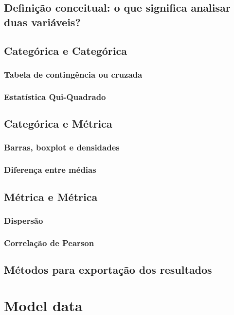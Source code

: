 \documentclass[a4paper,12pt]{article}
\begin{document}
\subsection*{Definição conceitual: o que significa analisar duas variáveis?}
\subsection*{Categórica e Categórica}
\subsubsection*{Tabela de contingência ou cruzada}
\subsubsection*{Estatística Qui-Quadrado}

\subsection*{Categórica e Métrica}
\subsubsection*{Barras, boxplot e densidades}
\subsubsection*{Diferença entre médias}

\subsection*{Métrica e Métrica}

\subsubsection*{Dispersão}
\subsubsection*{Correlação de Pearson}

\subsection*{Métodos para exportação dos resultados}

\section{Model data}
\end{document}
